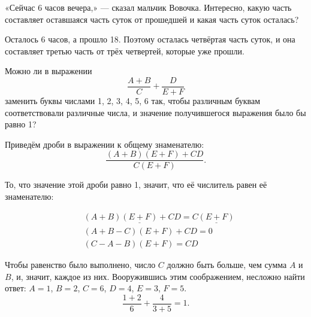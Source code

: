 \begin{itemize}

	\itA «Сейчас 6 часов вечера,» — сказал мальчик Вовочка. Интересно, какую часть составляет оставшаяся часть суток от прошедшей и какая часть суток осталась?
	
	\itr Осталось 6 часов, а прошло 18. Поэтому осталась четвёртая часть суток, и она составляет третью часть от трёх четвертей, которые уже прошли.
	
	\itC Можно ли в выражении
	$$\frac{A+B}{C} + \frac{D}{E+F}$$
	заменить буквы числами 1, 2, 3, 4, 5, 6 так, чтобы различным буквам соответствовали различные числа, и значение получившегося выражения было бы равно 1?
	
	\itr Приведём дроби в выражении к общему знаменателю:
	$$\frac{(A+B)(E+F) + CD}{C(E+F)}.$$
	
	То, что значение этой дроби равно 1, значит, что её числитель равен её знаменателю:

	\vspace{-0.6cm}
	\begin{align*}
		& (A+B) \underline{(E+F)} + CD = C \underline{(E+F)} \\
		& (A+B-C)(E+F) + CD = 0 \\
		& (C-A-B)(E+F) = CD
	\end{align*}
	
	Чтобы равенство было выполнено, число $C$ должно быть больше, чем сумма $A$ и $B$, и, значит, каждое из них. Вооружившись этим соображением, несложно найти ответ: $A=1$, $B=2$, $C=6$, $D=4$, $E=3$, $F=5$.
	$$\frac{1+2}{6}+\frac{4}{3+5} = 1.$$
	
\end{itemize}


